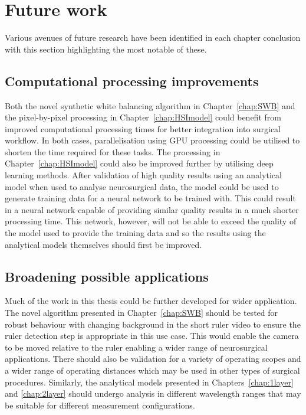 \section{Future work}
Various avenues of future research have been identified in each chapter conclusion with this section highlighting the most notable of these. 

\subsection{Computational processing improvements}
Both the novel synthetic white balancing algorithm in Chapter~\ref{chap:SWB} and the pixel-by-pixel processing in Chapter~\ref{chap:HSImodel} could benefit from improved computational processing times for better integration into surgical workflow. In both cases, parallelisation using GPU processing could be utilised to shorten the time required for these tasks. The processing in Chapter~\ref{chap:HSImodel} could also be improved further by utilising deep learning methods. After validation of high quality results using an analytical model when used to analyse neurosurgical data, the model could be used to generate training data for a neural network to be trained with. This could result in a neural network capable of providing similar quality results in a much shorter processing time. This network, however, will not be able to exceed the quality of the model used to provide the training data and so the results using the analytical models themselves should first be improved. 

\subsection{Broadening possible applications}
Much of the work in this thesis could be further developed for wider application. The novel algorithm presented in Chapter~\ref{chap:SWB} should be tested for robust behaviour with changing background in the short ruler video to ensure the ruler detection step is appropriate in this use case. This would enable the camera to be moved relative to the ruler enabling a wider range of neurosurgical applications. There should also be validation for a variety of operating scopes and a wider range of operating distances which may be used in other types of surgical procedures. Similarly, the analytical models presented in Chapters~\ref{chap:1layer} and \ref{chap:2layer} should undergo analysis in different wavelength ranges that may be suitable for different measurement configurations. 

